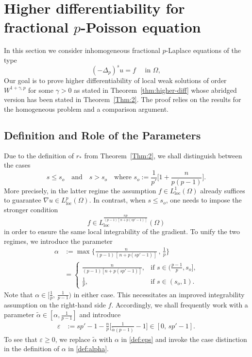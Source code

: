 \documentclass[10pt,letterpaper]{amsart}
\theoremstyle{definition}
\numberwithin{theorem}{section}
\numberwithin{equation}{section}
\newcommand{\1}{\ensuremath{\mathds{1}}}
\DeclareMathOperator{\loc}{loc}
\numberwithin{equation}{section}
\begin{document}
\section{Higher differentiability for fractional $p$-Poisson equation}\label{S:3}

In this section we consider inhomogeneous fractional $p$-Laplace equations of the type  
\begin{equation} \label{eq:frac-p}
        \left( - \Delta_p\right)^s u = f \quad \text{ in } \Omega,
\end{equation}
Our goal is to prove higher differentiability of local weak solutions of order $W^{1+\gamma,p}$ for some $\gamma>0$ as stated in Theorem~\ref{thm:higher-diff} whose abridged version has been stated in Theorem~\ref{Thm:2}. The proof relies on the results for the homogeneous problem and a comparison argument.

\subsection{Definition and Role of the Parameters}
Due to the definition of $r_*$ from Theorem~\ref{Thm:2}, we shall
distinguish between the cases
\begin{equation*}%
s \le s_o
\quad\text{and}\quad
s > s_o
\quad\mbox{where } s_o:=\frac{1}{p'}\bigg[1+\frac{n}{p(p-1)}\bigg].
\end{equation*}
More precisely, in the latter regime
the assumption \(f\in L_{\loc}^{1}(\Omega)\) already suffices to guarantee
\(\nabla u\in L^{p}_{\mathrm{loc}}(\Omega)\).
In contrast, when
\(s \le s_o\),
one needs to impose the stronger condition
\[
f\in L_{\loc}^{\frac{np}{(p-1)[\,n+p(sp'-1)\,]}}(\Omega)
\]
in order to ensure the same local integrability of the gradient. To unify the two regimes, we introduce the parameter
\begin{align}\label{def:alpha}
    \alpha 
    &:=
    \max\bigg\{\frac{n}{(p-1)\,[\,n+p(sp'-1)\,]}\,,\, \frac{1}{p}\bigg\} \nonumber \\[6pt]
    &=\left\{
    \begin{array}{cl}
    \displaystyle
        \frac{n}{(p-1)[n+p(sp'-1)]}, & \mbox{if $\displaystyle s\in(\tfrac{p-1}{p},s_o]$,}\\[12pt]
        \displaystyle\frac{1}{p}, &  \mbox{if $\displaystyle s\in(s_o,1)$.}
    \end{array}
    \right.
\end{align}
Note that \(\alpha\in[\tfrac{1}{p},\,\tfrac{1}{p-1})\) in either case.
This necessitates an improved integrability assumption on the right-hand side $f$.
Accordingly, we shall frequently work with a parameter
$\tilde\alpha\in[\alpha,\tfrac{1}{p-1}]$ and introduce
\begin{align}\label{def:eps}
    \varepsilon
    &:=
    sp' - 1 - \frac{n}{p}\bigg[\frac{1}{\tilde\alpha (p-1)}-1\bigg]
    \in [0,\, sp'-1].
\end{align}
To see that $\varepsilon\ge 0$, we replace $\tilde\alpha$ with $\alpha$ in
\eqref{def:eps} and invoke the case distinction in the definition of $\alpha$
in \eqref{def:alpha}. 
\end{document}
